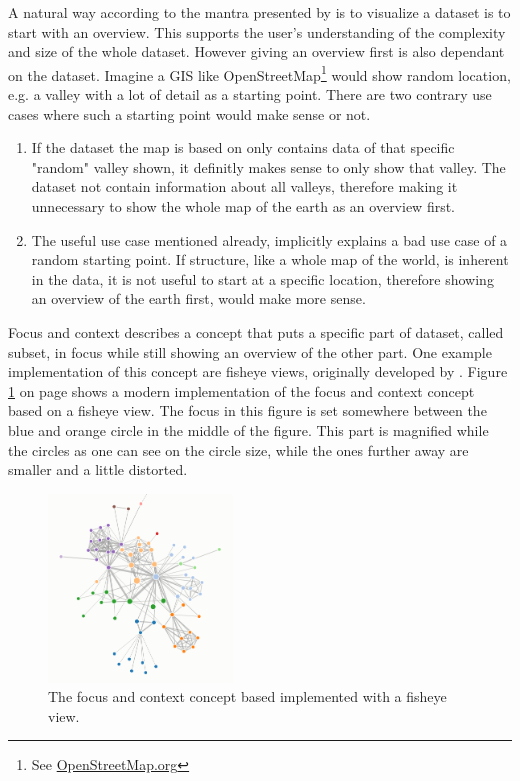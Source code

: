 A natural way according to the mantra presented by \citeauthor{Shneiderman1996} is to visualize a dataset is to start with an overview. This supports the user's understanding of the complexity and size of the whole dataset. However giving an overview first is also dependant on the dataset. Imagine a \ac{GIS} like OpenStreetMap\footnote{See \href{https://www.openstreetmap.org}{OpenStreetMap.org}} would show random location, e.g. a valley with a lot of detail as a starting point. There are two contrary use cases where such a starting point would make sense or not.
\begin{enumerate}
\item If the dataset the map is based on only contains data of that specific "random" valley shown, it definitly makes sense to only show that valley. The dataset not contain information about all valleys, therefore making it unnecessary to show the whole map of the earth as an overview first.
\item The useful use case mentioned already, implicitly explains a bad use case of a random starting point. If structure, like a whole map of the world, is inherent in the data, it is not useful to start at a specific location, therefore showing an overview of the earth first, would make more sense.
\end{enumerate}

Focus and context describes a concept that puts a specific part of dataset, called subset, in focus while still showing an overview of the other part. One example implementation of this concept are fisheye views, originally developed by \citeauthor{Furnas:1986} . Figure \ref{fig:focus} on page \pageref{fig:focus} shows a modern implementation of the focus and context concept based on a fisheye view. The focus in this figure is set somewhere between the blue and orange circle in the middle of the figure. This part is magnified while the circles as one can see on the circle size, while the ones further away are smaller and a little distorted.

\begin{figure}[!htb]
\centering
\includegraphics[height=5cm,keepaspectratio]{images/methods/interaction/focus.png}
\caption[
    The focus and context concept based implemented with a fisheye view, Urldate: 07.2016 \newline
    \small\texttt{\url{https://bost.ocks.org/mike/fisheye/}}.
]{The focus and context concept based implemented with a fisheye view.}
\label{fig:focus}
\end{figure}

